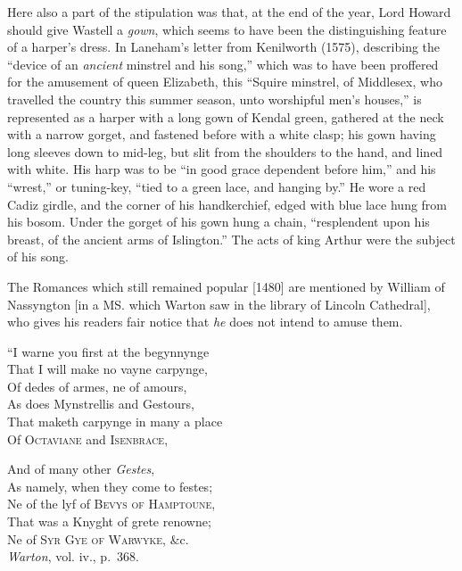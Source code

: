 \renewcommand\rectoheader{edward iv.} %


Here also a part of the stipulation was that, at the end of the year, Lord
Howard should give Wastell a \textit{gown}, which seems to have been the distinguishing
feature of a harper’s dress. In Laneham’s letter from Kenilworth (1575),
describing the “device of an \textit{ancient} minstrel and his song,” which was to have
been proffered for the amusement of queen Elizabeth, this “Squire minstrel, of
Middlesex, who travelled the country this summer season, unto worshipful men’s
houses,” is represented as a harper with a long gown of Kendal green, gathered
at the neck with a narrow gorget, and fastened before with a white clasp; his
gown having long sleeves down to mid-leg, but slit from the shoulders to the
hand, and lined with white. His harp was to be “in good grace dependent before
him,” and his “wrest,” or tuning-key, “tied to a green lace, and hanging by.”
He wore a red Cadiz girdle, and the corner of his handkerchief, edged with blue
lace hung from his bosom. Under the gorget of his gown hung a chain, “resplendent
upon his breast, of the ancient arms of Islington.” The acts of king
Arthur were the subject of his song.

The Romances which still remained popular [1480] are mentioned by William
of Nassyngton [in a MS. which Warton saw in the library of Lincoln Cathedral],
who gives his readers fair notice that \textit{he} does not intend to amuse them.


\settowidth{\versewidth}{“I warne you first at the begynnynge}

\begin{dcverse}
“I warne you first at the begynnynge\\
That I will make no vayne carpynge,\\
Of dedes of armes, ne of amours,\\
As does Mynstrellis and Gestours,\\
That maketh carpynge in many a place\\
Of \textsc{Octaviane} and \textsc{Isenbrace},

And of many other \textit{Gestes},\\
As namely, when they come to festes;\\
Ne of the lyf of \textsc{Bevys of Hamptoune},\\
That was a Knyght of grete renowne;\\
Ne of \textsc{Syr Gye of Warwyke}, \&c.\\
\hfill\textit{Warton}, vol. iv., p.~368.
\end{dcverse}



